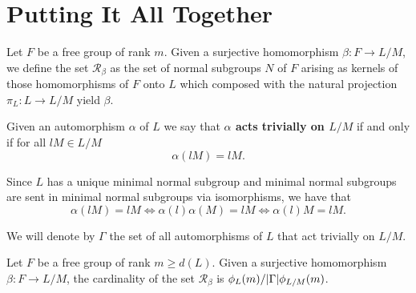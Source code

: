 \section{Putting It All Together}


\begin{definition}
    Let $F$ be a free group of rank $m$. Given a surjective homomorphism $\beta \colon F \rightarrow L/M$, we define the set $\mathscr{R}_\beta$ as the set of normal subgroups $N$ of $F$ arising as kernels of those homomorphisms of $F$ onto $L$ which composed with the natural projection $\pi_L \colon L \rightarrow L/M$ yield $\beta$.
\end{definition}

\begin{definition}
    Given an automorphism $\alpha$ of $L$ we say that \textbf{$\alpha$ acts trivially on $L/M$} if and only if for all $lM \in L/M$
    $$
    \alpha(lM) = lM.
    $$    
\end{definition}

Since $L$ has a unique minimal normal subgroup and minimal normal subgroups are sent in minimal normal subgroups via isomorphisms, we have that 
$$
\alpha(lM) = lM \iff \alpha(l)\alpha(M) = lM \iff \alpha(l)M = lM.
$$

\begin{definition}
    We will denote by $\Gamma$ the set of all automorphisms of $L$ that act trivially on $L/M$.    
\end{definition}

\begin{theorem}
    \label{PHallT}
    Let $F$ be a free group of rank $m \ge d(L)$. Given a surjective homomorphism $\beta \colon F \rightarrow L/M$, the cardinality of the set $\mathscr{R}_{\beta}$ is $\phi_L(m)/| \Gamma |\phi_{L/M}(m)$. 
\end{theorem}

